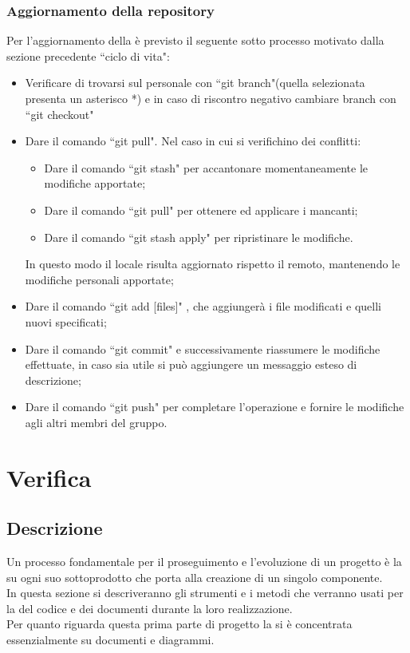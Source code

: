 \documentclass[NormeDiProgetto.tex]{subfiles}
\begin{document}
	\subsubsection{Aggiornamento della repository}
	Per l'aggiornamento della  è previsto il seguente sotto processo motivato dalla sezione precedente \textquotedblleft ciclo di vita":
	\begin{itemize}
		\item Verificare di trovarsi sul  personale con \textquotedblleft git branch"(quella selezionata presenta un asterisco *) e in caso di riscontro negativo cambiare branch con \textquotedblleft git checkout"
		\item Dare il comando \textquotedblleft git pull". Nel caso in cui si verifichino dei conflitti:
		\begin{itemize}
			\item Dare il comando \textquotedblleft git stash" per accantonare momentaneamente	le modifiche apportate;
			\item Dare il comando \textquotedblleft git pull" per ottenere ed applicare i  mancanti;
			\item Dare il comando \textquotedblleft git stash apply" per ripristinare le modifiche.
		\end{itemize}
		In questo modo il  locale risulta aggiornato rispetto il  remoto, mantenendo le modifiche personali apportate;
	
		\item Dare il comando \textquotedblleft git add [files]" , che aggiungerà i file modificati e quelli nuovi specificati;
		\item Dare il comando \textquotedblleft git commit" e successivamente riassumere le modifiche effettuate, in caso sia utile si può aggiungere un messaggio esteso di descrizione;
		\item Dare il comando \textquotedblleft git push" per completare l'operazione e fornire le modifiche agli altri membri del gruppo.
	\end{itemize}

	
	\section{Verifica}
	
	\subsection{Descrizione}
	Un processo fondamentale per il proseguimento e l'evoluzione di un progetto è la  su ogni suo sottoprodotto che porta alla creazione di un singolo componente.\\
	In questa sezione si descriveranno gli strumenti e i metodi che verranno usati per la  del codice e dei documenti durante la loro realizzazione.\\
	Per quanto riguarda questa prima parte di progetto la  si è concentrata essenzialmente su documenti e diagrammi.
	
\end{document}
